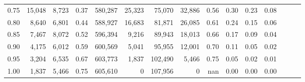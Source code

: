 \begin{tabular}{rrrrrrrrrrrrrrr}
0.75 &  15,048 &  8,723 &  0.37 &  580,287 &   25,323 &   75,070 &   32,886 &  0.56 &  0.30 &  0.23 &      0.08 \\
0.80 &   8,640 &  6,801 &  0.44 &  588,927 &   16,683 &   81,871 &   26,085 &  0.61 &  0.24 &  0.15 &      0.06 \\
0.85 &   7,467 &  8,072 &  0.52 &  596,394 &    9,216 &   89,943 &   18,013 &  0.66 &  0.17 &  0.09 &      0.04 \\
0.90 &   4,175 &  6,012 &  0.59 &  600,569 &    5,041 &   95,955 &   12,001 &  0.70 &  0.11 &  0.05 &      0.02 \\
0.95 &   3,204 &  6,535 &  0.67 &  603,773 &    1,837 &  102,490 &    5,466 &  0.75 &  0.05 &  0.02 &      0.01 \\
1.00 &   1,837 &  5,466 &  0.75 &  605,610 &        0 &  107,956 &        0 &   nan &  0.00 &  0.00 &      0.00 \\
\bottomrule
\end{tabular}
